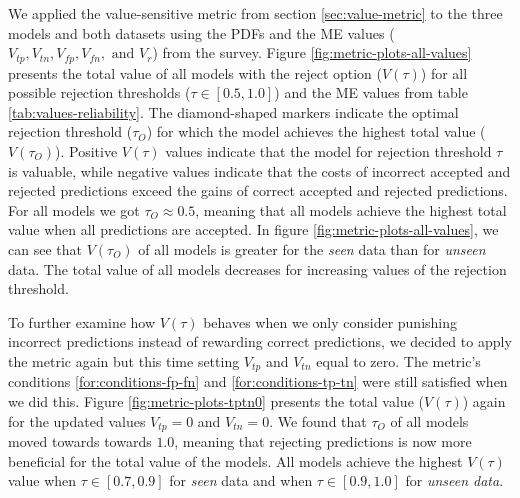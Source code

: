 %
We applied the value-sensitive metric from section \ref{sec:value-metric} to the three models and both datasets using the PDFs and the ME values ($V_{tp}, V_{tn}, V_{fp}, V_{fn}, \text{ and } V_r$) from the survey.
%
Figure \ref{fig:metric-plots-all-values} presents the total value of all models with the reject option ($V(\tau)$) for all possible rejection thresholds ($\tau \in [0.5, 1.0]$) and the ME values from table \ref{tab:values-reliability}.
%
The diamond-shaped markers indicate the optimal rejection threshold ($\tau_O$) for which the model achieves the highest total value ($V(\tau_O)$).
%
Positive $V(\tau)$ values indicate that the model for rejection threshold $\tau$ is valuable, while negative values indicate that the costs of incorrect accepted and rejected predictions exceed the gains of correct accepted and rejected predictions.
%
For all models we got $\tau_O \approx 0.5$, meaning that all models achieve the highest total value when all predictions are accepted.
%
In figure \ref{fig:metric-plots-all-values}, we can see that $V(\tau_O)$ of all models is greater for the \emph{seen} data than for \emph{unseen} data.
%
The total value of all models decreases for increasing values of the rejection threshold.
%

%
To further examine how $V(\tau)$ behaves when we only consider punishing incorrect predictions instead of rewarding correct predictions, we decided to apply the metric again but this time setting $V_{tp}$ and $V_{tn}$ equal to zero.
%
The metric's conditions \ref{for:conditions-fp-fn} and \ref{for:conditions-tp-tn} were still satisfied when we did this.
%
Figure \ref{fig:metric-plots-tptn0} presents the total value ($V(\tau)$) again for the updated values $V_{tp}=0$ and $V_{tn}=0$.
%
We found that $\tau_O$ of all models moved towards towards $1.0$, meaning that rejecting predictions is now more beneficial for the total value of the models.
%
All models achieve the highest $V(\tau)$ value when $\tau \in [0.7, 0.9]$ for \emph{seen} data and when $\tau \in [0.9, 1.0]$ for \emph{unseen data}.
%

